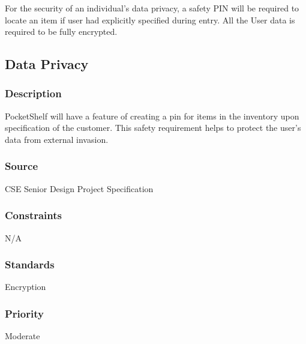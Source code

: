 For the security of an individual's data privacy, a safety PIN will be required to locate an item if user had explicitly specified during entry.
All the User data is required to be fully encrypted. 

\subsection{Data Privacy}
\subsubsection{Description}
PocketShelf will have a feature of creating a pin for items in the inventory upon specification of the customer. This safety requirement helps to protect the user's data from external invasion.
\subsubsection{Source}
CSE Senior Design Project Specification
\subsubsection{Constraints}
N/A
\subsubsection{Standards}
Encryption
\subsubsection{Priority}
Moderate


